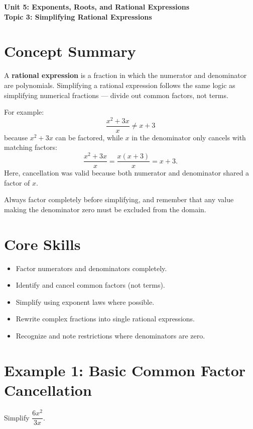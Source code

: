 \documentclass[12pt]{article}
\begin{document}
\begin{center}
    \LARGE \textbf{Unit 5: Exponents, Roots, and Rational Expressions} \\[6pt]
    \Large \textbf{Topic 3: Simplifying Rational Expressions}
\end{center}

\vspace{1em}

\section*{Concept Summary}

A \textbf{rational expression} is a fraction in which the numerator and denominator are polynomials.  
Simplifying a rational expression follows the same logic as simplifying numerical fractions — divide out common factors, not terms.

For example:
\[
\frac{x^2 + 3x}{x} \ne x + 3
\]
because \(x^2 + 3x\) can be factored, while \(x\) in the denominator only cancels with matching factors:
\[
\frac{x^2 + 3x}{x} = \frac{x(x + 3)}{x} = x + 3.
\]
Here, cancellation was valid because both numerator and denominator shared a factor of \(x\).

Always factor completely before simplifying, and remember that any value making the denominator zero must be excluded from the domain.

\section*{Core Skills}
\begin{itemize}
  \item Factor numerators and denominators completely.
  \item Identify and cancel common factors (not terms).
  \item Simplify using exponent laws where possible.
  \item Rewrite complex fractions into single rational expressions.
  \item Recognize and note restrictions where denominators are zero.
\end{itemize}

\section*{Example 1: Basic Common Factor Cancellation}

Simplify \(\dfrac{6x^2}{3x}\).
\end{document}
